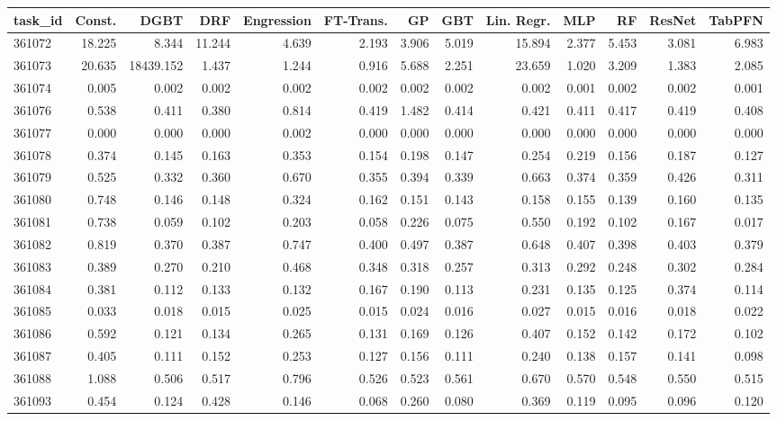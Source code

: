 \begin{tabular}{lrrrrrrrrrrrr}
\toprule
task\_id & Const. & DGBT & DRF & Engression & FT-Trans. & GP & GBT & Lin. Regr. & MLP & RF & ResNet & TabPFN \\
\midrule
361072 & 18.225 & 8.344 & 11.244 & 4.639 & 2.193 & 3.906 & 5.019 & 15.894 & 2.377 & 5.453 & 3.081 & 6.983 \\
361073 & 20.635 & 18439.152 & 1.437 & 1.244 & 0.916 & 5.688 & 2.251 & 23.659 & 1.020 & 3.209 & 1.383 & 2.085 \\
361074 & 0.005 & 0.002 & 0.002 & 0.002 & 0.002 & 0.002 & 0.002 & 0.002 & 0.001 & 0.002 & 0.002 & 0.001 \\
361076 & 0.538 & 0.411 & 0.380 & 0.814 & 0.419 & 1.482 & 0.414 & 0.421 & 0.411 & 0.417 & 0.419 & 0.408 \\
361077 & 0.000 & 0.000 & 0.000 & 0.002 & 0.000 & 0.000 & 0.000 & 0.000 & 0.000 & 0.000 & 0.000 & 0.000 \\
361078 & 0.374 & 0.145 & 0.163 & 0.353 & 0.154 & 0.198 & 0.147 & 0.254 & 0.219 & 0.156 & 0.187 & 0.127 \\
361079 & 0.525 & 0.332 & 0.360 & 0.670 & 0.355 & 0.394 & 0.339 & 0.663 & 0.374 & 0.359 & 0.426 & 0.311 \\
361080 & 0.748 & 0.146 & 0.148 & 0.324 & 0.162 & 0.151 & 0.143 & 0.158 & 0.155 & 0.139 & 0.160 & 0.135 \\
361081 & 0.738 & 0.059 & 0.102 & 0.203 & 0.058 & 0.226 & 0.075 & 0.550 & 0.192 & 0.102 & 0.167 & 0.017 \\
361082 & 0.819 & 0.370 & 0.387 & 0.747 & 0.400 & 0.497 & 0.387 & 0.648 & 0.407 & 0.398 & 0.403 & 0.379 \\
361083 & 0.389 & 0.270 & 0.210 & 0.468 & 0.348 & 0.318 & 0.257 & 0.313 & 0.292 & 0.248 & 0.302 & 0.284 \\
361084 & 0.381 & 0.112 & 0.133 & 0.132 & 0.167 & 0.190 & 0.113 & 0.231 & 0.135 & 0.125 & 0.374 & 0.114 \\
361085 & 0.033 & 0.018 & 0.015 & 0.025 & 0.015 & 0.024 & 0.016 & 0.027 & 0.015 & 0.016 & 0.018 & 0.022 \\
361086 & 0.592 & 0.121 & 0.134 & 0.265 & 0.131 & 0.169 & 0.126 & 0.407 & 0.152 & 0.142 & 0.172 & 0.102 \\
361087 & 0.405 & 0.111 & 0.152 & 0.253 & 0.127 & 0.156 & 0.111 & 0.240 & 0.138 & 0.157 & 0.141 & 0.098 \\
361088 & 1.088 & 0.506 & 0.517 & 0.796 & 0.526 & 0.523 & 0.561 & 0.670 & 0.570 & 0.548 & 0.550 & 0.515 \\
361093 & 0.454 & 0.124 & 0.428 & 0.146 & 0.068 & 0.260 & 0.080 & 0.369 & 0.119 & 0.095 & 0.096 & 0.120 \\

\end{tabular}
